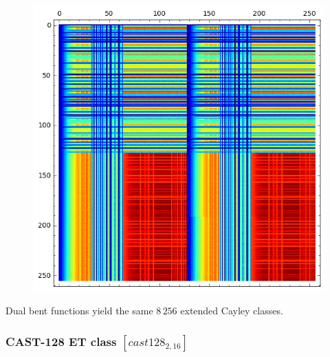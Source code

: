 \documentclass[pdf,sprung,slideColor,nocolorBG]{beamer}
\newenvironment{colortheme}[1]{
\def\ProvidesPackageRCS $##1${\relax}
\renewcommand{\ProcessOptions}{\relax}
\makeatletter

\makeatother
}{}
\begin{document}
\begin{colortheme}{jubata}
\begin{frame}
\begin{figure}
\begin{minipage}{.48\textwidth}
\includegraphics[width=.9\linewidth]{../matrix_plot/cast128_2_1_bent_cayley_graph_index_matrix.png}
  \label{fig:cast128_2_1_bent_cayley_graph_index_matrix}
\end{minipage}%
\end{figure}
Dual bent functions yield the same $8\,256$ extended Cayley classes.
\end{frame}

\begin{frame}
\frametitle{CAST-128 ET class $[cast128_{2,16}]$}
\begin{figure}
\centering
\begin{minipage}{.48\textwidth}
  \centering


\end{minipage}
\end{figure}
\end{frame}
\end{colortheme}
\end{document}
